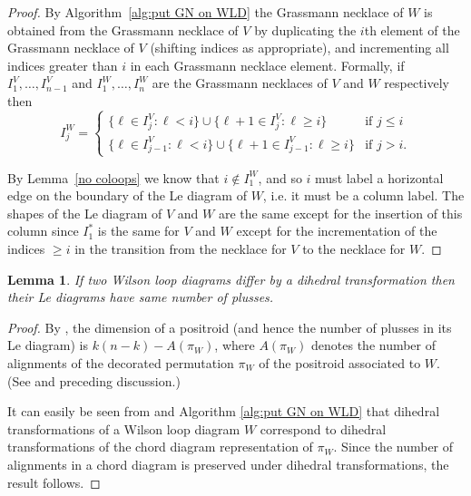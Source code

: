 \documentclass[11pt]{article}
\newtheorem{lem}[thm]{Lemma}
\theoremstyle{remark}
\theoremstyle{definition}
\begin{document}
\begin{proof}
  By Algorithm~\ref{alg:put GN on WLD} the Grassmann necklace of $W$ is obtained from the Grassmann necklace of $V$ by duplicating the $i$th element of the Grassmann necklace of $V$ (shifting indices as appropriate), and incrementing all indices greater than $i$ in each Grassmann necklace element.  Formally, if $I_1^{V}, \ldots, I_{n-1}^{V}$ and $I_1^{W}, \ldots, I_n^{W}$ are the Grassmann necklaces of $V$ and $W$ respectively then
  \[
  I_j^{W} =
  \begin{cases}
    \{\ell \in I_j^{V} : \ell < i\} \cup \{\ell+1 \in I_j^{V} : \ell \geq i\} & \text{if $j\leq i$} \\
    \{\ell \in I_{j-1}^{V} : \ell < i\} \cup \{\ell+1 \in I_{j-1}^{V} : \ell \geq i\} & \text{if $j > i$.}
  \end{cases}
  \]


By Lemma~\ref{no coloops} we know that $i \not\in I_1^W$, and so $i$ must label a horizontal edge on the boundary of the Le diagram of $W$, i.e. it must be a column label. The shapes of the Le diagram of $V$ and $W$ are the same except for the insertion of this column since $I_1^*$ is the same for $V$ and $W$ except for the incrementation of the indices $\geq i$ in the transition from the necklace for $V$ to the necklace for $W$. 
\end{proof}


\begin{lem}\label{lem dihedral}
If two Wilson loop diagrams differ by a dihedral transformation then their Le diagrams have same number of plusses.
\end{lem}
\begin{proof}
By \cite[Proposition 17.10]{Postnikov}, the dimension of a positroid (and hence the number of plusses in its Le diagram) is $k(n-k) - A(\pi_W)$, where $A(\pi_W)$ denotes the number of alignments of the decorated permutation $\pi_W$ of the positroid associated to $W$. (See \cite[Figure 17.1]{Postnikov} and preceding discussion.)

It can easily be seen from \cite[Section 17]{Postnikov} and Algorithm \ref{alg:put GN on WLD} that dihedral transformations of a Wilson loop diagram $W$ correspond to dihedral transformations of the chord diagram representation of $\pi_W$. Since the number of alignments in a chord diagram is preserved under dihedral transformations, the result follows.
\end{proof}
\end{document}
